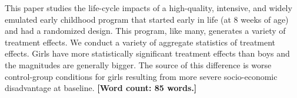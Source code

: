 \noindent This paper studies the life-cycle impacts of a high-quality, intensive, and widely emulated early childhood program that started early in life (at 8 weeks of age) and had a randomized design. This program, like many, generates a variety of treatment effects. We conduct a variety of aggregate statistics of treatment effects. Girls have more statistically significant treatment effects than boys and the magnitudes are generally bigger. The source of this difference is worse control-group conditions for girls resulting from more severe socio-economic disadvantage at baseline. \textbf{[Word count: 85 words.]}
